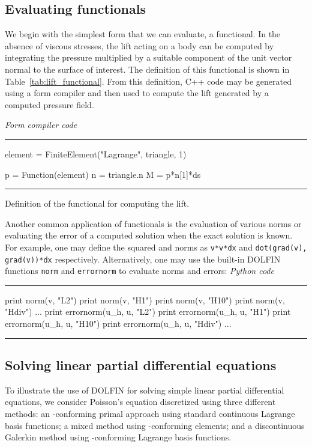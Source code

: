 \documentclass[acmtoms]{acmtrans2m}
\newenvironment{pythoncode}[1]{\center\minipage{#1\textwidth}\footnotesize\hfill\it Python code \rm\vspace{0.1cm}\hrule\renewcommand{\baselinestretch}{0.9}\footnotesize\verbatim}{\endverbatim\hrule\normalsize\endminipage\newline\endcenter}
\newenvironment{ffccode}[1]{\center\minipage{#1\textwidth}\footnotesize\hfill\it Form compiler code \rm\vspace{0.1cm}\hrule\renewcommand{\baselinestretch}{0.9}\footnotesize\verbatim}{\endverbatim\hrule\normalsize\endminipage\newline\endcenter}
\newcommand{\emp}[1]{\texttt{#1}}
\newcommand{\dolfin}{DOLFIN}
\begin{document}
\subsection{Evaluating functionals}

We begin with the simplest form that we can evaluate, a functional. In
the absence of viscous stresses, the lift acting on a body can be computed
by integrating the pressure multiplied by a suitable component of the
unit vector normal to the surface of interest. The definition of this
functional is shown in Table~\ref{tab:lift_functional}. From this
definition, C++ code may be generated using a form compiler and then
used to compute the lift generated by a computed pressure field.
\begin{table}
\begin{ffccode}{0.9}
element = FiniteElement("Lagrange", triangle, 1)

p = Function(element)
n = triangle.n
M = p*n[1]*ds
\end{ffccode}
\caption{Definition of the functional for computing the lift.}
\label{tab:lift_functional}
\end{table}



Another common application of functionals is the evaluation of various
norms or evaluating the error of a computed solution when the exact
solution is known. For example, one may define the squared  and
 norms as \emp{v*v*dx} and \emp{dot(grad(v), grad(v))*dx}
respectively. Alternatively, one may use the built-in \dolfin{}
functions \emp{norm} and \emp{errornorm} to evaluate norms and errors:
\begin{pythoncode}{0.9}
print norm(v, "L2")
print norm(v, "H1")
print norm(v, "H10")
print norm(v, "Hdiv")
...
print errornorm(u_h, u, "L2")
print errornorm(u_h, u, "H1")
print errornorm(u_h, u, "H10")
print errornorm(u_h, u, "Hdiv")
...
\end{pythoncode}

\subsection{Solving linear partial differential equations}

To illustrate the use of \dolfin{} for solving simple linear partial
differential equations, we consider Poisson's equation 
discretized using three different methods: an -conforming
primal approach using standard continuous Lagrange basis functions; a
mixed method using -conforming elements; and a
discontinuous Galerkin method using -conforming
Lagrange basis functions.
\end{document}
